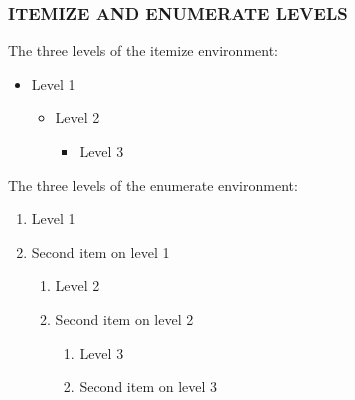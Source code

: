 \documentclass{beamer}
\begin{document}
\begin{frame}
  \frametitle{ITEMIZE AND ENUMERATE LEVELS}
  The three levels of the itemize environment:
  \begin{itemize}
  \item Level 1
    \begin{itemize}
    \item Level 2
      \begin{itemize}
      \item Level 3
      \end{itemize}
    \end{itemize}
  \end{itemize}
  \par
  The three levels of the enumerate environment:
  \begin{enumerate}
  \item Level 1
  \item Second item on level 1
    \begin{enumerate}
    \item Level 2
    \item Second item on level 2
      \begin{enumerate}
      \item Level 3
      \item Second item on level 3
      \end{enumerate}
    \end{enumerate}
  \end{enumerate}
\end{frame}
\end{document}
